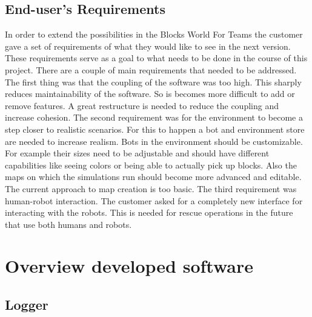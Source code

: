 \documentclass[]{article}
\begin{document}
\subsection{End-user's Requirements}
In order to extend the possibilities in the Blocks World For Teams the customer gave a set of requirements of what they would like to see in the next version. These requirements serve as a goal to what needs to be done in the course of this project. There are a couple of main requirements that needed to be addressed. The first thing was that the coupling of the software was too high. This sharply reduces maintainability of the software. So is becomes more difficult to add or remove features. A great restructure is needed to reduce the coupling and increase cohesion. The second requirement was for the environment to become a step closer to realistic scenarios. For this to happen a bot and environment store are needed to increase realism. Bots in the environment should be customizable. For example their sizes need to be adjustable and should have different capabilities like seeing colors or being able to actually pick up blocks. Also the maps on which the simulations run should become more advanced and editable. The current approach to map creation is too basic. The third requirement was human-robot interaction. The customer asked for a completely new interface for interacting with the robots. This is needed for rescue operations in the future that use both humans and robots.
\section{Overview developed software}
\subsection{Logger}
\end{document}
